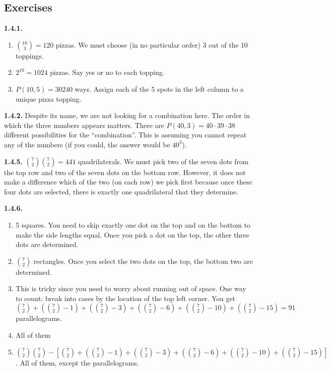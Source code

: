 \documentclass[10pt,]{book}
\theoremstyle{plain}
\theoremstyle{definition}
\theoremstyle{definition}
\theoremstyle{definition}
\theoremstyle{definition}
\numberwithin{equation}{chapter}
\begin{document}
\subsection*{ Exercises}
\noindent\textbf{1.4.1.} \hypertarget{p-935}{}%
\leavevmode%
\begin{enumerate}[label=(\alph*)]
\item\hypertarget{li-433}{}\({10 \choose 3} = 120\) pizzas.  We must choose (in no particular order) 3 out of the 10 toppings.%
\item\hypertarget{li-434}{}\(2^{10} = 1024\) pizzas.  Say yes or no to each topping.%
\item\hypertarget{li-435}{}\(P(10,5) = 30240\) ways.  Assign each of the 5 spots in the left column to a unique pizza topping.%
\end{enumerate}
%
\par\smallskip
\noindent\textbf{1.4.2.} \hypertarget{p-937}{}%
Despite its name, we are not looking for a combination here. The order in which the three numbers appears matters. There are \(P(40,3) = 40\cdot 39 \cdot 38\) different possibilities for the ``combination''. This is assuming you cannot repeat any of the numbers (if you could, the answer would be \(40^3\)).%
\par\smallskip
\noindent\textbf{1.4.5.} \hypertarget{p-946}{}%
\({7\choose 2}{7\choose 2} = 441\) quadrilaterals. We must pick two of the seven dots from the top row and two of the seven dots on the bottom row. However, it does not make a difference which of the two (on each row) we pick first because once these four dots are selected, there is exactly one quadrilateral that they determine.%
\par\smallskip
\noindent\textbf{1.4.6.} \hypertarget{p-953}{}%
\leavevmode%
\begin{enumerate}[label=(\alph*)]
\item\hypertarget{li-445}{}\hypertarget{p-954}{}%
5 squares. You need to skip exactly one dot on the top and on the bottom to make the side lengths equal.  Once you pick a dot on the top, the other three dots are determined.%
\item\hypertarget{li-446}{}\({7 \choose 2}\) rectangles.  Once you select the two dots on the top, the bottom two are determined.%
\item\hypertarget{li-447}{}\hypertarget{p-955}{}%
This is tricky since you need to worry about running out of space.  One way to count: break into cases by the location of the top left corner.  You get \({7 \choose 2} + ({7 \choose 2}-1) + ({7 \choose 2} - 3) + ({7 \choose 2} - 6) + ({7 \choose 2} - 10) + ({7 \choose 2} - 15) = 91\) parallelograms.%
\item\hypertarget{li-448}{}\hypertarget{p-956}{}%
All of them%
\item\hypertarget{li-449}{}\hypertarget{p-957}{}%
\({7\choose 2}{7\choose 2} - \left[ {7 \choose 2} + ({7 \choose 2}-1) + ({7 \choose 2} - 3) + ({7 \choose 2} - 6) + ({7 \choose 2} - 10) + ({7 \choose 2} - 15) \right]\). All of them, except the parallelograms.%
\end{enumerate}
\end{document}
